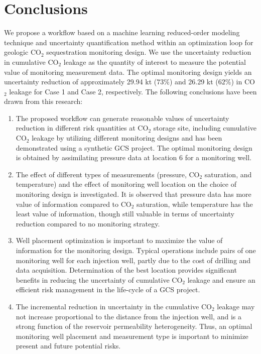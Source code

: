 \documentclass[a4paper,fleqn]{cas-sc}
\begin{document}
\section{Conclusions}
We propose a workflow based on a machine learning reduced-order modeling technique and uncertainty quantification method within an optimization loop for geologic CO$_2$ sequestration monitoring design. We use the uncertainty reduction in cumulative CO$_2$ leakage as the quantity of interest to measure the potential value of monitoring measurement data. The optimal monitoring design yields an uncertainty reduction of approximately 29.94 kt ($73\%$) and 26.29 kt ($62\%$) in CO$_2$ leakage for Case 1 and Case 2, respectively. The following conclusions have been drawn from this research:
\begin{enumerate}
    \item The proposed workflow can generate reasonable values of uncertainty reduction in different risk quantities at CO$_2$ storage site, including cumulative CO$_2$ leakage by utilizing different monitoring designs and has been demonstrated using a synthetic GCS project. The optimal monitoring design is obtained by assimilating pressure data at location 6 for a monitoring well.
    
    \item The effect of different types of measurements (pressure, CO$_2$ saturation, and temperature) and the effect of monitoring well location on the choice of monitoring design is investigated. It is observed that pressure data has more value of information compared to CO$_2$ saturation, while temperature has the least value of information, though still valuable in terms of uncertainty reduction compared to no monitoring strategy.
    
    \item Well placement optimization is important to maximize the value of information for the monitoring design. Typical operations include pairs of one monitoring well for each injection well, partly due to the cost of drilling and data acquisition. Determination of the best location provides significant benefits in reducing the uncertainty of cumulative CO$_2$ leakage and ensure an efficient risk management in the life-cycle of a GCS project.
    
    \item The incremental reduction in uncertainty in the cumulative CO$_2$ leakage may not increase proportional to the distance from the injection well, and is a strong function of the reservoir permeability heterogeneity. Thus, an optimal monitoring well placement and measurement type is important to minimize present and future potential risks.
    

\end{enumerate}
\end{document}

